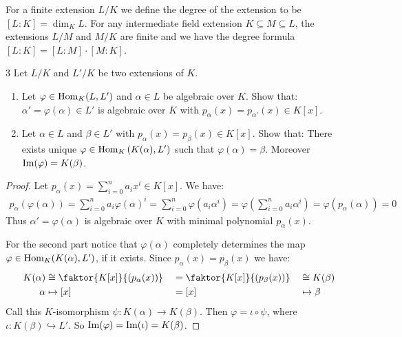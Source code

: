 \documentclass[twoside = false,	%
		headsepline,		%
		parskip = true,
		]{scrbook}						%
\begin{document}
        For a finite extension $L/K$ we define the degree of the extension to be $[L:K] = \dim_K L$. For any intermediate field extension $K \subseteq M \subseteq L$, the extensions $L/M$ and $M/K$ are finite and we have the degree formula $[L:K] = [L:M] \cdot [M:K]$.
        
        \begin{exercise}{}{3}
            Let $L/K$ and $L'/K$ be two extensions of $K$.
            \begin{enumerate}
                \item Let $\varphi \in \mathrm{Hom}_K(L,L')$ and $\alpha \in L$ be algebraic over $K$. Show that: $\alpha' = \varphi(\alpha) \in L'$ is algebraic over $K$ with $p_\alpha(x) = p_{\alpha'}(x) \in K[x]$.
                \item Let $\alpha \in L$ and $\beta \in L'$ with $p_\alpha(x) = p_\beta(x) \in K[x]$. Show that: There exists unique $\varphi \in \mathrm{Hom}_K\left(K(\alpha),L'\right)$ such that $\varphi(\alpha) = \beta$. Moreover $\mathrm{Im}(\varphi) = K(\beta)$.
            \end{enumerate}
        \end{exercise}
        
        \begin{proof}
            Let $p_\alpha(x) = \sum_{i=0}^{n} a_i x^i \in K[x]$. We have:
            \begin{align*}
                p_\alpha(\varphi(\alpha)) = \sum_{i=0}^{n} a_i \varphi(\alpha)^i = \sum_{i=0}^{n} \varphi(a_i \alpha^i) =  \varphi\left( \sum_{i=0}^{n} a_i \alpha^i\right) = \varphi(p_\alpha(\alpha)) = 0
            \end{align*}
            Thus $\alpha' = \varphi(\alpha)$ is algebraic over $K$ with minimal polynomial $p_\alpha(x)$.
            
            For the second part notice that $\varphi(\alpha)$ completely determines the map $\varphi \in \mathrm{Hom}_K(K(\alpha),L')$, if it exists. Since $p_\alpha(x) = p_\beta(x)$ we have:
            \begin{alignat*}{3}
                K(\alpha) &\cong \faktor{K[x]}{\round{p_\alpha(x)}} &&= \faktor{K[x]}{\round{p_\beta(x)}} &&\cong K(\beta)\\
                 \alpha &\mapsto [x] &&=[x] &&\mapsto \beta
            \end{alignat*}
            Call this $K$-isomorphism $\psi: K(\alpha) \rightarrow K(\beta)$. Then $\varphi = \iota \circ \psi$, where $\iota: K(\beta) \hookrightarrow L'$. So $\mathrm{Im}(\varphi) = \mathrm{Im}(\iota) = K(\beta)$.
        \end{proof}
        
\end{document}
